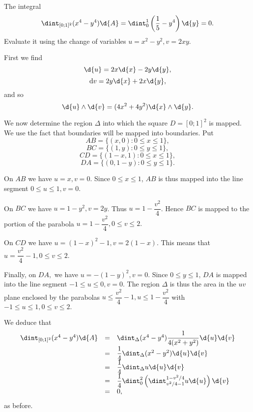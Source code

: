 \begin{exa}
The integral
$$\dint _{[0;1]^2} (x^4 - y^4) \d{A}
= \dint _0 ^1  \left( \dfrac{1}{5} - y^4\right)\d{y}
 = 0.$$ Evaluate it
using the change of variables $u = x^2 - y^2, v = 2xy.$
\end{exa}
\begin{solu} First we find
$$\d{u}= 2x\d{x}- 2y\d{y},$$
$${\rm d}v = 2y\d{x}+ 2x\d{y},$$and so
$$\d{u}\wedge\d{v} = (4x^2 + 4y^2)\d{x}\wedge \d{y}.$$


We now determine the region $\Delta$ into which the square $D =
[0; 1 ]^2$ is mapped. We use the fact that boundaries will be
mapped into boundaries. Put $$AB = \{(x, 0): 0 \leq x \leq 1\},$$
$$BC = \{(1, y): 0 \leq y \leq 1\},$$ $$CD = \{(1 - x, 1): 0 \leq x
\leq 1\},$$ $$DA = \{(0, 1 - y): 0 \leq y \leq 1\}.$$




On $AB$ we have $u = x, v = 0.$ Since $0 \leq x \leq 1$, $AB$ is
thus mapped into the line segment $0 \leq u \leq 1, v = 0$.




On $BC$ we have $u = 1 - y^2, v = 2y$. Thus $u = 1 -
\dfrac{v^2}{4}$. Hence $BC$ is mapped to the portion of the
parabola $u = 1 - \dfrac{v^2}{4}, 0 \leq v \leq 2.$




On $CD$ we have $u = (1 - x)^2 - 1, v = 2(1 - x).$ This means that
$u = \dfrac{v^2}{4} - 1, 0 \leq v \leq 2.$




Finally, on $DA,$ we have $u = -(1 - y)^2, v = 0.$ Since $0 \leq y
\leq 1$, $DA$ is mapped into the line segment $-1 \leq u \leq 0, v
= 0.$ The region $\Delta$ is thus the area in the $uv$ plane
enclosed by the parabolas $u \leq \dfrac{v^2}{4} - 1, u \leq 1 -
\dfrac{v^2}{4}$ with $ -1 \leq u \leq 1, 0 \leq v \leq 2.$



We deduce that
$$\begin{array}{lll}\dint _{[0;1]^2} (x^4 - y^4) \d{A}& = &  \dint _{\Delta} 
(x^4 - y^4) \dfrac{1}{4(x^2 + y^2)}
\d{u}\d{v} \\
& = &  \dfrac{1}{4}\dint _{\Delta} (x^2 - y^2)
\d{u}\d{v} \\
& = &  \dfrac{1}{4}\dint _{\Delta} u
\d{u}\d{v} \\
& = & \dfrac{1}{4}\dint _0 ^2 \left( \dint _{v^2/4 - 1} ^{1 - v^2/4}
u
\d{u}\right)\d{v} \\
& = & 0,
\end{array}$$as before.
\end{solu}
